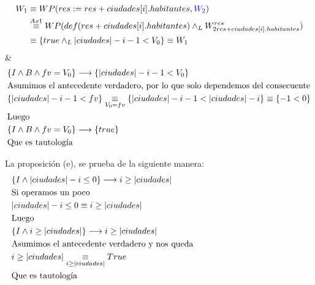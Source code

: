 \documentclass[10pt,a4paper,fleqn]{article}
\begin{document}
\begin{align*}
    W_{1} &\equiv WP(res := res + ciudades[i].habitantes, \textcolor{blue}{W_2})  \\
    &\overset{Ax1}{\equiv} WP(def(res + ciudades[i].habitantes) \land _L W_{2 res + ciudades[i].habitantes}^{res})  \\
    &\equiv  \{ true \land _L |ciudades| - i - 1 < V_{0} \} \equiv W_1 
\end{align*}
& 
\begin{align*}
	&\{I \land B \land fv = V_{0} \} \longrightarrow \{ |ciudades| - i - 1 < V_{0} \}  \\
    &\text{Asumimos el antecedente verdadero, por lo que solo dependemos del consecuente}  \\
	& \{ |ciudades| - i - 1 < fv \} \underset{V_0 = fv}{\equiv} \{ |ciudades| - i - 1 < |ciudades| - i \} \equiv \{ - 1 < 0 \}  \\
	&\text{Luego}  \\
	&\{I \land B \land fv = V_{0} \} \longrightarrow \{ true \}  \\
	&\text{Que es tautología} 
\end{align*}
\indent

\noindent La proposición (e), se prueba de la siguiente manera:
\begin{align*}
    &\{ I \land |ciudades| - i \leq 0 \} \implica i \geq |ciudades|  \\
    &{\parbox{\textwidth}{ {Si operamos un poco}}}  \\
    &|ciudades| - i \leq 0 \equiv i \geq |ciudades|  \\
    &{\parbox{\textwidth}{ {Luego}}}  \\
	&\{ I \land i \geq |ciudades| \} \implica i \geq |ciudades|  \\
    &\text{Asumimos el antecedente verdadero y nos queda}  \\
    &i \geq |ciudades| \underset{i \geq |ciudades|}{\equiv} True  \\
    &{\parbox{\textwidth}{ {Que es tautología}}}  
\end{align*}


\noindent {} \\ 
\noindent {}\\
\end{document}
